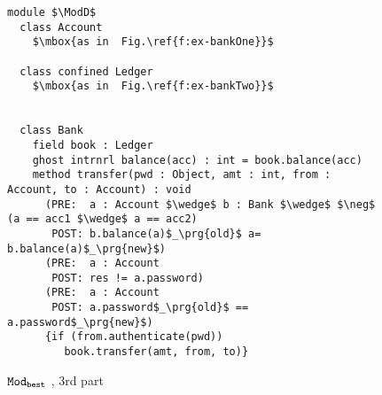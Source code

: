 \begin{figure}[ht]
\begin{lstlisting}[mathescape=true, frame=lines]
module $\ModD$
  class Account
    $\mbox{as in  Fig.\ref{f:ex-bankOne}}$

  class confined Ledger
    $\mbox{as in  Fig.\ref{f:ex-bankTwo}}$
      

  class Bank
    field book : Ledger
    ghost intrnrl balance(acc) : int = book.balance(acc)
    method transfer(pwd : Object, amt : int, from : Account, to : Account) : void
      (PRE:  a : Account $\wedge$ b : Bank $\wedge$ $\neg$ (a == acc1 $\wedge$ a == acc2)
       POST: b.balance(a)$_\prg{old}$ a= b.balance(a)$_\prg{new}$)
      (PRE:  a : Account
       POST: res != a.password)
      (PRE:  a : Account
       POST: a.password$_\prg{old}$ == a.password$_\prg{new}$)
      {if (from.authenticate(pwd))
         book.transfer(amt, from, to)}
\end{lstlisting}
\caption{${\texttt{Mod}}_{{\texttt{best}}}$ \funcSpecs,  3rd part}
\label{f:ex-bankThree}
\end{figure}


